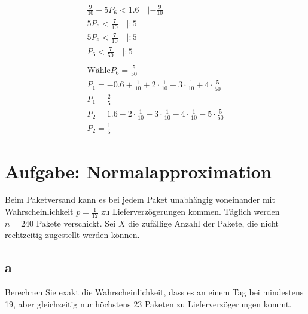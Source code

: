 \begin{align*}
    \frac{9}{10} + 5P_6 < 1.6 \quad | -\frac{9}{10}                                                       \\
    5P_6 < \frac{7}{10} \quad | : 5                                                                       \\
    5P_6 < \frac{7}{10} \quad | : 5                                                                       \\
    P_6 < \frac{7}{50} \quad | : 5                                                                        \\\\
    \text{Wähle} P_6 = \frac{5}{50}                                                                       \\
    P_1 = -0.6 + \frac{1}{10} + 2 \cdot \frac{1}{10} + 3 \cdot \frac{1}{10} + 4 \cdot \frac{5}{50}        \\
    P_1 = \frac{2}{5}                                                                                     \\
    P_2 = 1.6 - 2 \cdot \frac{1}{10} - 3 \cdot \frac{1}{10} - 4 \cdot \frac{1}{10} - 5 \cdot \frac{5}{50} \\
    P_2 = \frac{1}{5}
\end{align*}

\section{Aufgabe: Normalapproximation}

Beim Paketversand kann es bei jedem Paket unabhängig voneinander mit
Wahrscheinlichkeit $p=\frac{1}{12}$ zu Lieferverzögerungen kommen. Täglich
werden $n=240$ Pakete verschickt. Sei $X$ die zufällige Anzahl der Pakete, die
nicht rechtzeitig zugestellt werden können.

\subsection{a}

Berechnen Sie exakt die Wahrscheinlichkeit, dass es an einem Tag bei mindestens
19, aber gleichzeitig nur höchstens 23 Paketen zu Lieferverzögerungen kommt.

